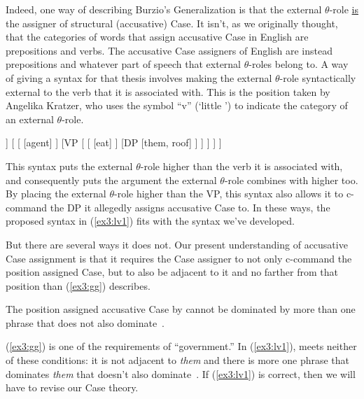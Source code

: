 Indeed, one way of describing Burzio's Generalization is that the external \mbox{$\theta$-role} \underline{is} the assigner of structural (accusative) Case. It isn't, as we originally thought, that the categories of words that assign accusative Case in English are prepositions and verbs. The accusative Case assigners of English are instead prepositions and whatever part of speech that external $\theta$-roles belong to. A way of giving a syntax for that thesis involves making the external $\theta$-role syntactically external to the verb that it is associated with. This is the position taken by Angelika Kratzer,\cite{Kratzer:1996} who uses the symbol ``v'' (`little \textipa{[vij]}') to indicate the category of an external \mbox{$\theta$-role}.
\begin{exe}
	\raggedright
	\ex \label{ex3:lv1} 
	\small
	\begin{forest}
	[vP
		[DP [Pius, roof]]
		[ 
			[ ]
			[VP [ 
				[ [eat] ]
				[DP [them, roof] ]
			] ]
		]
	]
	\end{forest}
\end{exe}
This syntax puts the external $\theta$-role higher than the verb it is associated with, and consequently puts the argument the external $\theta$-role combines with higher too. By placing the external $\theta$-role higher than the VP, this syntax also allows it to c-command the DP it allegedly assigns accusative Case to. In these ways, the proposed syntax in (\ref{ex3:lv1}) fits with the syntax we've developed.

But there are several ways it does not. Our present understanding of accusative Case assignment is that it requires the Case assigner to not only c-command the position assigned Case, but to also be adjacent to it and no farther from that position than (\ref{ex3:gg}) describes.
\begin{exe}
	\raggedright
	\ex \label{ex3:gg} The position assigned accusative Case by  cannot be dominated by more than one phrase that does not also dominate~.
\end{exe}
(\ref{ex3:gg}) is one of the requirements of ``government.'' In (\ref{ex3:lv1}),  meets neither of these conditions: it is not adjacent to \emph{them} and there is more one phrase that dominates \emph{them} that doesn't also dominate~. If (\ref{ex3:lv1}) is correct, then we will have to revise our Case theory. 

